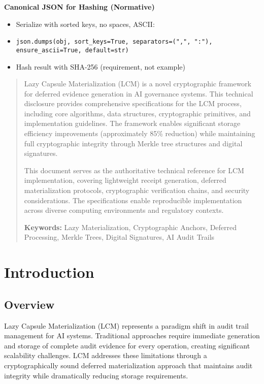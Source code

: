 \documentclass[12pt,a4paper]{article}
\begin{document}
\begin{titlepage}
\begin{infobox}
\textbf{Canonical JSON for Hashing (Normative)}
\begin{itemize}
\item Serialize with sorted keys, no spaces, ASCII:
\item \texttt{json.dumps(obj, sort\_keys=True, separators=(",", ":"),} \\
      \texttt{ensure\_ascii=True, default=str)}
\item Hash result with SHA-256 (requirement, not example)
\end{itemize}
\end{infobox}

\vfill
\end{titlepage}

\begin{abstract}
Lazy Capsule Materialization (LCM\texttrademark) is a novel cryptographic framework for deferred evidence generation in AI governance systems. This technical disclosure provides comprehensive specifications for the LCM process, including core algorithms, data structures, cryptographic primitives, and implementation guidelines. The framework enables significant storage efficiency improvements (approximately 85\% reduction) while maintaining full cryptographic integrity through Merkle tree structures and digital signatures.

This document serves as the authoritative technical reference for LCM implementation, covering lightweight receipt generation, deferred materialization protocols, cryptographic verification chains, and security considerations. The specifications enable reproducible implementation across diverse computing environments and regulatory contexts.

\textbf{Keywords:} Lazy Materialization, Cryptographic Anchors, Deferred Processing, Merkle Trees, Digital Signatures, AI Audit Trails
\end{abstract}

\newpage
\tableofcontents
\newpage

\section{Introduction}

\subsection{Overview}

Lazy Capsule Materialization (LCM) represents a paradigm shift in audit trail management for AI systems. Traditional approaches require immediate generation and storage of complete audit evidence for every operation, creating significant scalability challenges. LCM addresses these limitations through a cryptographically sound deferred materialization approach that maintains audit integrity while dramatically reducing storage requirements.
\end{document}
